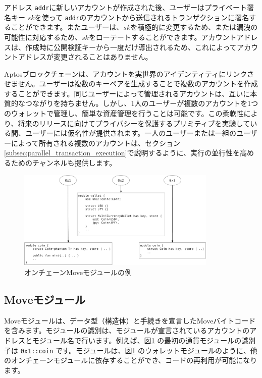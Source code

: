 \documentclass{article}
\begin{document}
アドレス \texttt{addr}に新しいアカウントが作成された後、ユーザーはプライベート署名キー $sk$を使って \texttt{addr}のアカウントから送信されるトランザクションに署名することができます。またユーザーは、$sk$を積極的に変更するため、または漏洩の可能性に対応するため、$sk$をローテートすることができます。アカウントアドレスは、作成時に公開検証キーから一度だけ導出されるため、これによってアカウントアドレスが変更されることはありません。

Aptosブロックチェーンは、アカウントを実世界のアイデンティティにリンクさせません。ユーザーは複数のキーペアを生成することで複数のアカウントを作成することができます。同じユーザーによって管理されるアカウントは、互いに本質的なつながりを持ちません。しかし、1人のユーザーが複数のアカウントを1つのウォレットで管理し、簡単な資産管理を行うことは可能です。この柔軟性により、将来のリリースに向けてプライバシーを保護するプリミティブを実験している間、ユーザーには仮名性が提供されます。一人のユーザーまたは一組のユーザーによって所有される複数のアカウントは、セクション\ref{subsec:parallel_transaction_execution}で説明するように、実行の並行性を高めるためのチャンネルも提供します。

\begin{figure}
\centering
\includegraphics[width=0.85\textwidth]{move_1.pdf}
\caption{\label{fig:move_modules}オンチェーンMoveモジュールの例}
\end{figure}

\subsection{Moveモジュール}
\label{sec:move_modules}

Moveモジュールは、データ型（構造体）と手続きを宣言したMoveバイトコードを含みます。モジュールの識別は、モジュールが宣言されているアカウントのアドレスとモジュール名で行います。例えば、図\ref{fig:move_modules} の最初の通貨モジュールの識別子は \texttt{0x1::coin} です。モジュールは、図\ref{fig:move_modules} のウォレットモジュールのように、他のオンチェーンモジュールに依存することができ、コードの再利用が可能になります。
\end{document}
